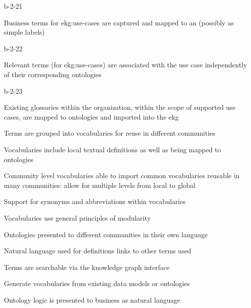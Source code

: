 \ekgmmCapabilitySectionLevelsOneFive

\begin{level-assessment}{b-2-2}{1}

  \item Business terms for \glspl{ekg:use-case} are captured and mapped to an 
        (possibly as simple labels)

\end{level-assessment}

\begin{level-assessment}{b-2-2}{2}

  \item Relevant terms (for \glspl{ekg:use-case}) are associated with the use case independently of
  their corresponding ontologies

\end{level-assessment}

\begin{level-assessment}{b-2-2}{3}

  \item Existing glossaries within the organization, within the scope of supported use cases,
        are mapped to ontologies and imported into the \gls{ekg}
  \item Terms are grouped into vocabularies for reuse in different communities
  \item Vocabularies include local textual definitions as well as being mapped to ontologies
  \item Community level vocabularies able to import common vocabularies reusable in many communities:
        allow for multiple levels from local to global
  \item Support for synonyms and abbreviations within vocabularies
  \item Vocabularies use general principles of modularity
  \item Ontologies presented to different communities in their own language
  \item Natural language used for definitions links to other terms used
  \item Terms are searchable via the knowledge graph interface
  \item Generate vocabularies from existing data models or ontologies
  \item Ontology logic is presented to business as natural language

\end{level-assessment}

